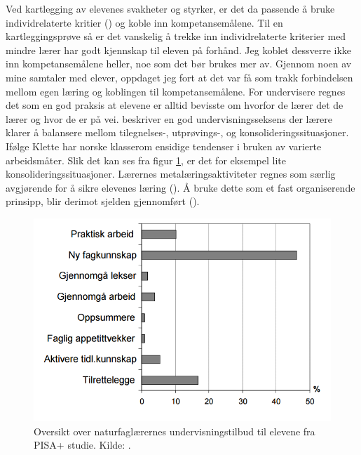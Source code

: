 \documentclass[main.tex]{subfiles}
\begin{document}
Ved kartlegging av elevenes svakheter og styrker, er det da passende å bruke
individrelaterte kritier () og koble inn kompetansemålene. Til en kartleggingsprøve så er det 
vanskelig å trekke inn individrelaterte kriterier med mindre lærer har godt kjennskap til eleven på forhånd. Jeg 
koblet dessverre ikke inn kompetansemålene heller, noe som det bør brukes mer av. Gjennom noen av mine samtaler 
med elever, oppdaget jeg fort at det var få som trakk forbindelsen mellom egen læring og koblingen til kompetansemålene. 
For undervisere regnes det som en god praksis at elevene er alltid bevisste om hvorfor de lærer det de lærer og hvor 
de er på vei.  beskriver en god undervisningsseksens der lærere klarer å balansere mellom 
tilegnelses-, utprøvings-, og konsolideringssituasjoner. Ifølge Klette har norske klasserom ensidige tendenser i bruken 
av varierte arbeidsmåter. Slik det kan ses fra figur \ref{fig:odeg10}, er det for eksempel lite 
konsolideringssituasjoner. Lærernes metalæringsaktiviteter regnes som særlig avgjørende for å sikre elevenes læring 
(). Å bruke dette som et fast organiserende prinsipp, blir derimot sjelden gjennomført 
().
\begin{figure}[h!]
\includegraphics[scale = 0.6]{../figures/undervisnings_aktivitet.png}
\caption{Oversikt over naturfaglærernes undervisningstilbud til elevene fra PISA+ studie. Kilde: 
\protect{}.}
\label{fig:odeg10}
\end{figure}
\newline
\end{document}
